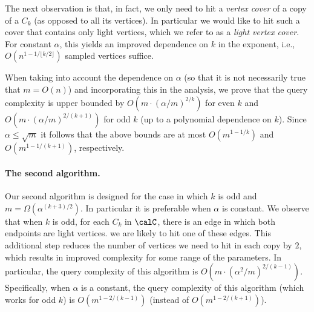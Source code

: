 The next observation is that, in fact, we only need to hit a \emph{vertex cover} of a copy of a $C_k$ (as opposed to all its vertices). In particular we would like to hit such a cover that contains only light vertices, which we refer to as a \emph{light vertex cover}. 
For constant $\alpha$, this yields an improved dependence on $k$ in the exponent, i.e., $O(n^{1-1/\lfloor k/2\rfloor})$ sampled vertices suffice.
%

When taking into account the dependence on $\alpha$ (so that it is not necessarily true that $m=O(n)$) and incorporating this in the analysis, we prove that the query complexity is upper bounded by $O(m \cdot (\alpha/m)^{2/k})$ for even $k$ and $O(m \cdot (\alpha/m)^{2/(k+1)})$ for odd $k$ 
(up to a polynomial dependence on $k$).
Since $\alpha \leq \sqrt{m}$ it follows that the above bounds are at most $O(m^{1-1/k})$ and $O(m^{1-1/(k+1)})$, respectively. 

\paragraph{The second algorithm.}
Our second algorithm is designed for the case in which $k$ is odd and $m = \Omega(\alpha^{(k+3)/2})$. In particular it is preferable when $\alpha$ is constant. 
We observe that when $k$ is odd, for each $C_k$ in $\calC$, there is an edge in 
 which both endpoints are light vertices.
  we are likely to hit one of these edges. This additional step reduces the number of vertices we need to hit in each copy by $2$, which  results in improved complexity for some range of the parameters. In particular, the query complexity of this algorithm is $O(m \cdot (\alpha^2/m)^{2/(k-1)})$.
 Specifically, when $\alpha$ is a constant, the query complexity of this algorithm (which works for odd $k$) is $O(m^{1-2/(k-1)})$ (instead of $O(m^{1-2/(k+1)})$).


